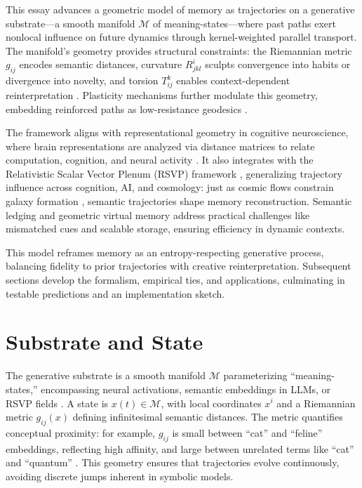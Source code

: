 \documentclass[a4paper,12pt]{article}
\newcommand{\M}{\mathcal{M}}
\begin{document}
This essay advances a geometric model of memory as trajectories on a generative substrate—a smooth manifold $\M$ of meaning-states—where past paths exert nonlocal influence on future dynamics through kernel-weighted parallel transport. The manifold's geometry provides structural constraints: the Riemannian metric $g_{ij}$ encodes semantic distances, curvature $R^i_{jkl}$ sculpts convergence into habits or divergence into novelty, and torsion $T^k_{ij}$ enables context-dependent reinterpretation \citep{penrose1989road}. Plasticity mechanisms further modulate this geometry, embedding reinforced paths as low-resistance geodesics \citep{hebb1949organization}. 

The framework aligns with representational geometry in cognitive neuroscience, where brain representations are analyzed via distance matrices to relate computation, cognition, and neural activity \citep{edelman1998representation}. It also integrates with the Relativistic Scalar Vector Plenum (RSVP) framework \citep{semantic2025}, generalizing trajectory influence across cognition, AI, and cosmology: just as cosmic flows constrain galaxy formation \citep{weinberg2008cosmology}, semantic trajectories shape memory reconstruction. Semantic ledging and geometric virtual memory \citep{kuijper2021geometric} address practical challenges like mismatched cues and scalable storage, ensuring efficiency in dynamic contexts.

This model reframes memory as an entropy-respecting generative process, balancing fidelity to prior trajectories with creative reinterpretation. Subsequent sections develop the formalism, empirical ties, and applications, culminating in testable predictions and an implementation sketch.

\section{Substrate and State}
The generative substrate is a smooth manifold $\M$ parameterizing ``meaning-states,'' encompassing neural activations, semantic embeddings in LLMs, or RSVP fields \citep{semantic2025}. A state is $x(t) \in \M$, with local coordinates $x^i$ and a Riemannian metric $g_{ij}(x)$ defining infinitesimal semantic distances. The metric quantifies conceptual proximity: for example, $g_{ij}$ is small between ``cat'' and ``feline'' embeddings, reflecting high affinity, and large between unrelated terms like ``cat'' and ``quantum'' \citep{edelman1998representation}. This geometry ensures that trajectories evolve continuously, avoiding discrete jumps inherent in symbolic models.
\end{document}
